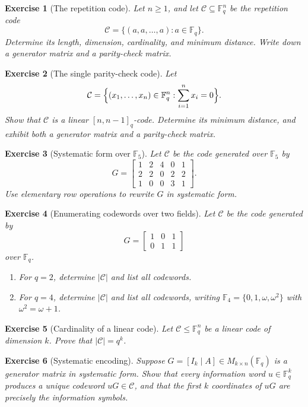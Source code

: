 \documentclass[11pt]{amsbook}
\theoremstyle{exstyle}
\newtheorem{exercise}{Exercise}
\theoremstyle{plain}
\newcommand{\F}{\mathbb{F}}
\newcommand{\Ccal}{\mathcal{C}}
\begin{document}
\begin{exercise}[The repetition code]
Let $n\geq 1$, and let $\Ccal\subseteq \F_q^n$ be the repetition code
\[
\Ccal=\{(a,a,\dots,a):a\in\F_q\}.
\]
Determine its length, dimension, cardinality, and minimum distance. Write down a generator matrix and a parity-check matrix.
\end{exercise}

\begin{exercise}[The single parity-check code]
Let
\[
\Ccal=\Bigl\{(x_1,\dots,x_n)\in\F_q^n:\sum_{i=1}^n x_i=0\Bigr\}.
\]
Show that $\Ccal$ is a linear $[n,n-1]_q$-code. Determine its minimum distance, and exhibit both a generator matrix and a parity-check matrix.
\end{exercise}

\begin{exercise}[Systematic form over $\F_5$]
Let $\Ccal$ be the code generated over $\F_5$ by
\[
G=
\begin{bmatrix}
1&2&4&0&1\\
2&2&0&2&2\\
1&0&0&3&1
\end{bmatrix}.
\]
Use elementary row operations to rewrite $G$ in systematic form.
\end{exercise}

\begin{exercise}[Enumerating codewords over two fields]
Let $\Ccal$ be the code generated by
\[
G=
\begin{bmatrix}
1&0&1\\
0&1&1
\end{bmatrix}
\]
over $\F_q$.
\begin{enumerate}[label=\textup{(\arabic*)}]
\item For $q=2$, determine $|\Ccal|$ and list all codewords.
\item For $q=4$, determine $|\Ccal|$ and list all codewords, writing $\F_4=\{0,1,\omega,\omega^2\}$ with $\omega^2=\omega+1$.
\end{enumerate}
\end{exercise}

\begin{exercise}[Cardinality of a linear code]
Let $\Ccal\leq \F_q^n$ be a linear code of dimension $k$. Prove that $|\Ccal|=q^k$.
\end{exercise}

\begin{exercise}[Systematic encoding]
Suppose $G=[I_k\mid A]\in M_{k\times n}(\F_q)$ is a generator matrix in systematic form. Show that every information word $u\in\F_q^k$ produces a unique codeword $uG\in\Ccal$, and that the first $k$ coordinates of $uG$ are precisely the information symbols.
\end{exercise}
\end{document}
